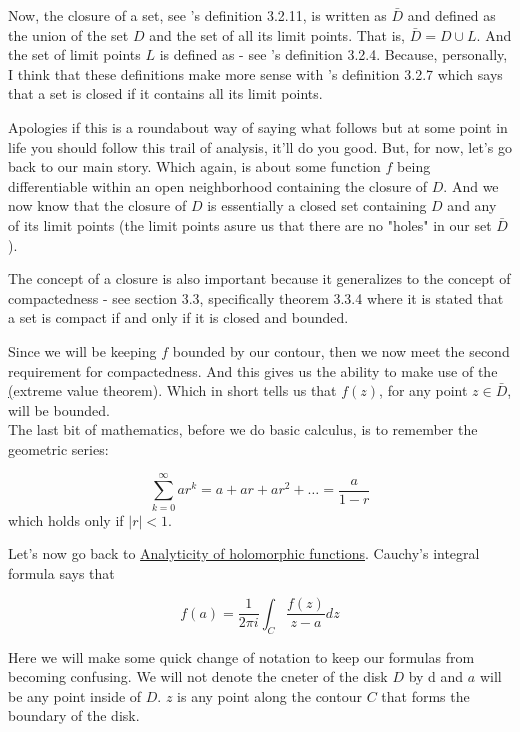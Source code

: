 Now, the closure of a set, see \cite{abbott}'s definition 3.2.11, is written as $\bar{D}$ and defined
as the union of the set $D$ and the set of all its limit points.
That is, $\bar{D} = D \cup L$.
And the set of limit points $L$ is defined as - see \cite{abbott}'s definition 3.2.4.
Because, personally, I think that these definitions make more sense with \cite{abbott}'s definition
3.2.7 which says that a set is closed if it contains all its limit points.

Apologies if this is a roundabout way of saying what follows but at some point in life you should follow
this trail of analysis, it'll do you good.
But, for now, let's go back to our main story.
Which again, is about some function $f$ being differentiable within an open neighborhood containing the
closure of $D$.
And we now know that the closure of $D$ is essentially a closed set containing $D$ and any of its limit points
(the limit points asure us that there are no "holes" in our set $\bar{D}$).

The concept of a closure is also important because it generalizes to the concept of compactedness - see
\cite{abbott} section 3.3, specifically theorem 3.3.4 where it is stated that a set is compact
if and only if it is closed and bounded.

Since we will be keeping $f$ bounded by our contour, then we now meet the second requirement for compactedness.
And this gives us the ability to make use of the
\href{https://en.wikipedia.org/wiki/Extreme_value_theorem}(extreme value theorem).
Which in short tells us that $f(z)$, for any point $z\in \bar{D}$, will be bounded.
\\

The last bit of mathematics, before we do basic calculus, is to remember the geometric series:

$$
\sum_{k=0}^{\infty} a r^k = a + ar + ar^2 + \dots = \frac{a}{1 - r}
$$
which holds only if $|r| < 1$.

Let's now go back to
\href{https://en.wikipedia.org/wiki/Analyticity_of_holomorphic_functions}{Analyticity of holomorphic functions}.
Cauchy's integral formula says that

$$
f(a) = \frac{1}{2\pi i} \int_{C} \frac{f(z)}{z - a} dz
$$

Here we will make some quick change of notation to keep our formulas from becoming confusing.
We will not denote the cneter of the disk $D$ by d and $a$ will be any point inside of $D$.
$z$ is any point along the contour $C$ that forms the boundary of the disk.


